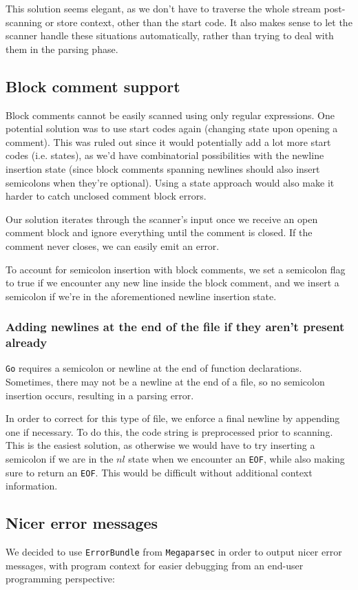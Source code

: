 \documentclass[11pt]{article}
\begin{document}
This solution seems elegant, as we don't have to traverse
the whole stream post-scanning or store context, other than the
start code. It also makes sense to let the scanner handle these
situations automatically, rather than trying to deal with them
in the parsing phase.
\subsection{Block comment support}
\label{sec:org1474253}
Block comments cannot be easily scanned using only regular
expressions. One potential solution was to use start codes again
(changing state upon opening a comment). This was ruled out since
it would potentially add a lot more start codes (i.e. states), as
we'd have combinatorial possibilities with the newline insertion state
(since block comments spanning newlines should also insert semicolons
when they're optional). Using a state approach would also make it
harder to catch unclosed comment block errors.

Our solution iterates through the scanner's input once we receive an
open comment block and ignore everything until the comment is closed.
If the comment never closes, we can easily emit an error.

To account for semicolon insertion with block comments, we set a
semicolon flag to true if we encounter any new line inside the
block comment, and we insert a semicolon if we're in the
aforementioned newline insertion state.
\subsubsection{Adding newlines at the end of the file if they aren't present already}
\label{sec:orgc64542b}
\texttt{Go} requires a semicolon or newline at the end of function
declarations. Sometimes, there may not be a newline at the end of
a file, so no semicolon insertion occurs, resulting in a parsing error.

In order to correct for this type of file, we enforce a final
newline by appending one if necessary. To do this, the code string
is preprocessed prior to scanning. This is the easiest solution,
as otherwise we would have to try inserting a semicolon if we are in
the \(nl\) state when we encounter an \texttt{EOF}, while also making sure
to return an \texttt{EOF}. This would be difficult without additional
context information.
\subsection{Nicer error messages}
\label{sec:org78ee27c}
We decided to use \texttt{ErrorBundle} from \texttt{Megaparsec} in order to
output nicer error messages, with program context for easier
debugging from an end-user programming perspective:
\end{document}
